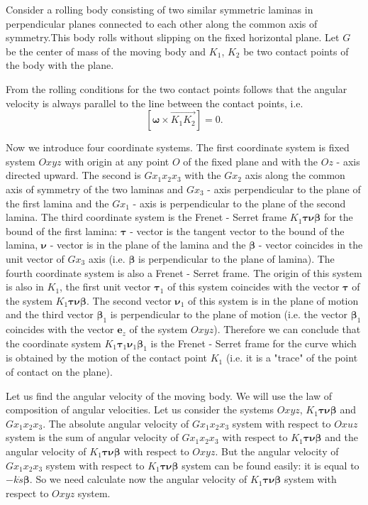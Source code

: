 \documentclass[10pt]{enoc2011}
\renewcommand{\vec}[1]{\boldsymbol{#1}}
\begin{document}
Consider a rolling body consisting of two similar symmetric laminas in perpendicular planes connected to each other along the common axis of symmetry.This body rolls without slipping on the fixed horizontal plane. Let $G$ be the center of mass of the moving body and $K_1$, $K_2$ be two contact points of the body with the plane.

From the rolling conditions for the two contact points follows that the angular
velocity is always parallel to the line between the contact points, i.e.
$$
\left[\vec\omega\times\overrightarrow{K_1K_2}\right]=0.
$$

Now we introduce four coordinate systems. The first coordinate system is fixed
system $Oxyz$ with origin at any point $O$ of the fixed plane and with the
$Oz$ - axis directed upward. The second is $Gx_1x_2x_3$
with the $Gx_2$ axis along the common axis of symmetry of the two
laminas and $Gx_3$ - axis perpendicular to the plane of the first lamina
and the $Gx_1$ - axis is perpendicular to the plane of the second lamina. The
third coordinate system is the Frenet - Serret frame
$K_1\vec\tau\vec\nu\vec\beta$ for the bound of the first lamina: $\vec\tau$
- vector is the tangent vector to the bound of the lamina, $\vec\nu$ -
vector is in the plane of the lamina and the $\vec\beta$ - vector coincides in
the unit vector of $Gx_3$ axis (i.e. $\vec\beta$ is perpendicular to the plane
of lamina). The fourth coordinate system is also a Frenet - Serret frame. The
origin of this system is also in $K_1$, the first unit vector $\vec\tau_1$ of
this system coincides with the vector $\vec\tau$ of the system
$K_1\vec\tau\vec\nu\vec\beta$. The second vector $\vec\nu_1$ of this system is
in the plane of motion and the third vector $\vec\beta_1$ is perpendicular to
the plane of motion (i.e. the vector $\vec\beta_1$ coincides with the vector
$\vec e_z$ of the system $Oxyz$). Therefore we can conclude that the coordinate
system $K_1\vec\tau_1\vec\nu_1\vec\beta_1$ is the Frenet - Serret frame for the
curve which is obtained by the motion of the contact point $K_1$ (i.e. it is a
"trace" of the point of contact on the plane).

Let us find the angular velocity of the moving body. We will use the law
of composition of angular velocities. Let us consider the systems $Oxyz$,
$K_1\vec\tau\vec\nu\vec\beta$ and $Gx_1x_2x_3$. The absolute angular velocity
of $Gx_1x_2x_3$ system with respect to $Oxuz$ system is the sum of angular
velocity of $Gx_1x_2x_3$ with respect to $K_1\vec\tau\vec\nu\vec\beta$ and the
angular velocity of $K_1\vec\tau\vec\nu\vec\beta$ with respect to $Oxyz$. But
the angular velocity of $Gx_1x_2x_3$ system with respect to
$K_1\vec\tau\vec\nu\vec\beta$ system can be found easily: it is equal to
$-k\dot{s}\vec\beta$. So we need calculate now the angular velocity of
$K_1\vec\tau\vec\nu\vec\beta$ system with respect to $Oxyz$ system.
\end{document}
